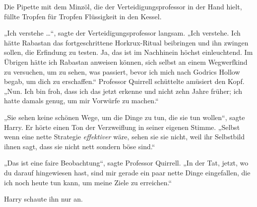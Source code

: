 Die Pipette mit dem Minzöl, die der Verteidigungsprofessor in der Hand hielt, füllte Tropfen für Tropfen Flüssigkeit in den Kessel.

„Ich verstehe …“, sagte der Verteidigungsprofessor langsam.
„Ich verstehe. Ich hätte Rabastan das fortgeschrittene Horkrux-Ritual beibringen und ihn zwingen sollen, die Erfindung zu testen. Ja, das ist im Nachhinein höchst einleuchtend. Im Übrigen hätte ich Rabastan anweisen können, sich selbst an einem Wegwerfkind zu versuchen, um zu sehen, was passiert, bevor ich mich nach Godrics Hollow begab, um dich zu erschaffen.“
Professor Quirrell schüttelte amüsiert den Kopf.
„Nun. Ich bin froh, dass ich das jetzt erkenne und nicht zehn Jahre früher; ich hatte damals genug, um mir Vorwürfe zu machen.“

„Sie sehen keine schönen Wege, um die Dinge zu tun, die sie tun wollen“, sagte Harry.
Er hörte einen Ton der Verzweiflung in seiner eigenen Stimme.
„Selbst wenn eine nette Strategie \emph{effektiver} wäre, sehen sie sie nicht, weil ihr Selbstbild ihnen sagt, dass sie nicht nett sondern böse sind.“

„Das ist eine faire Beobachtung“, sagte Professor Quirrell.
„In der Tat, jetzt, wo du darauf hingewiesen hast, sind mir gerade ein paar nette Dinge eingefallen, die ich noch heute tun kann, um meine Ziele zu erreichen.“

Harry schaute ihn nur an.

